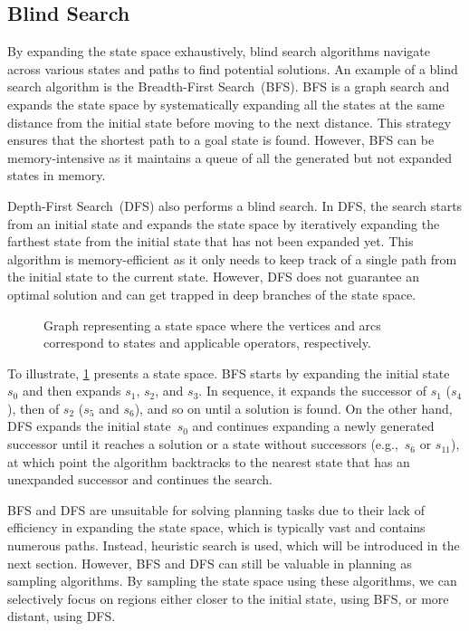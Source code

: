 \subsection{Blind Search}
\label{sec:blind-search}

By expanding the state space exhaustively, blind search algorithms navigate across various states and paths to find potential solutions. An example of a blind search algorithm is the Breadth-First Search~(BFS). BFS is a graph search and expands the state space by systematically expanding all the states at the same distance from the initial state before moving to the next distance. This strategy ensures that the shortest path to a goal state is found. However, BFS can be memory-intensive as it maintains a queue of all the generated but not expanded states in memory.

Depth-First Search~(DFS) also performs a blind search. In DFS, the search starts from an initial state and expands the state space by iteratively expanding the farthest state from the initial state that has not been expanded yet. This algorithm is memory-efficient as it only needs to keep track of a single path from the initial state to the current state. However, DFS does not guarantee an optimal solution and can get trapped in deep branches of the state space.

\begin{figure}[tb]
    \caption[Graph representing a state space.]{Graph representing a state space where the vertices and arcs correspond to states and applicable operators, respectively.}
    \label{fig:statespace}
    \addmargin
    \centering
    
\end{figure}

To illustrate, \cref{fig:statespace} presents a state space. BFS starts by expanding the initial state~$s_0$ and then expands $s_1$, $s_2$, and $s_3$. In sequence, it expands the successor of $s_1$ ($s_4$), then of $s_2$ ($s_5$ and $s_6$), and so on until a solution is found. On the other hand, DFS expands the initial state~$s_0$ and continues expanding a newly generated successor until it reaches a solution or a state without successors (e.g.,~$s_6$ or $s_{11}$), at which point the algorithm backtracks to the nearest state that has an unexpanded successor and continues the search.

BFS and DFS are unsuitable for solving planning tasks due to their lack of efficiency in expanding the state space, which is typically vast and contains numerous paths. Instead, heuristic search is used, which will be introduced in the next section. However, BFS and DFS can still be valuable in planning as sampling algorithms. By sampling the state space using these algorithms, we can selectively focus on regions either closer to the initial state, using BFS, or more distant, using DFS.

